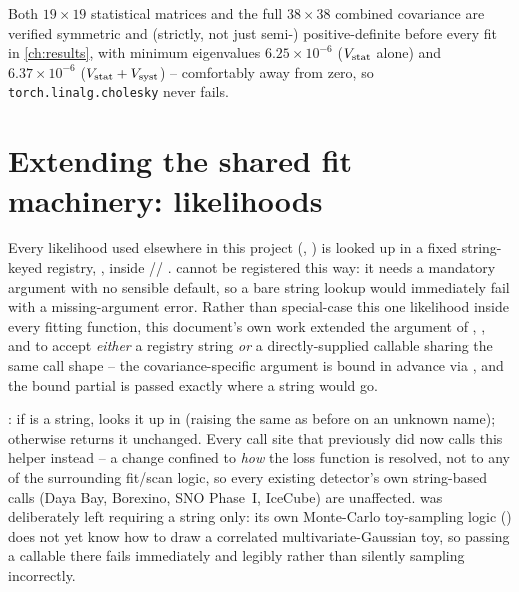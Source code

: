 \begin{resultbox}
Both $19\times19$ statistical matrices and the full $38\times38$ combined
covariance are verified symmetric and (strictly, not just semi-)
positive-definite before every fit in \cref{ch:results}, with minimum
eigenvalues $6.25\times10^{-6}$ ($V_{\rm stat}$ alone) and
$6.37\times10^{-6}$ ($V_{\rm stat}+V_{\rm syst}$) -- comfortably away from
zero, so \texttt{torch.linalg.cholesky} never fails.
\end{resultbox}

\section{Extending the shared fit machinery: \texorpdfstring{}{str or Callable} likelihoods}
\label{sec:callable-extension}


\begin{theorybox}
Every likelihood used elsewhere in this project (,
) is looked up in a fixed string-keyed registry,
, inside //
.  cannot be
registered this way: it needs a mandatory  argument with
no sensible default, so a bare string lookup would immediately fail with a
missing-argument error. Rather than special-case this one likelihood
inside every fitting function, this document's own work extended the
 argument of ,
, and  to accept
\emph{either} a registry string \emph{or} a directly-supplied callable
sharing the same  call shape -- the covariance-specific argument is bound in advance
via ,
and the bound partial is passed exactly where a string would go.
\end{theorybox}

\begin{implbox}
: if  is a
string, looks it up in  (raising the same
 as before on an unknown name); otherwise returns it
unchanged. Every call site that previously did
 now calls this helper instead --
a change confined to \emph{how} the loss function is resolved, not to any
of the surrounding fit/scan logic, so every existing detector's own
string-based calls (Daya Bay, Borexino, SNO Phase~I, IceCube) are
unaffected.  was deliberately left
requiring a string only: its own Monte-Carlo toy-sampling logic
() does not yet know how to draw a correlated
multivariate-Gaussian toy, so passing a callable there fails immediately
and legibly rather than silently sampling incorrectly.
\end{implbox}

